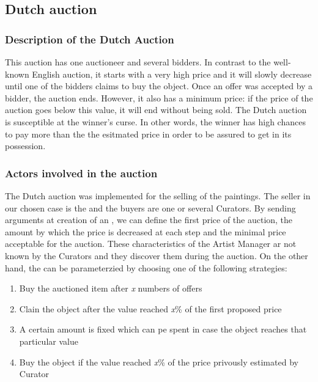 \documentclass[a4paper,11pt]{article}
\begin{document}
  \subsection{Dutch auction}

  \subsubsection{Description of the Dutch Auction}
  
  This auction has one auctioneer and several bidders. In contrast to the well-known English 
  auction, it starts with a very high price and it will slowly decrease until one of the bidders 
  claims to buy the object. Once an offer was accepted by a bidder, the auction ends. However, 
  it also has a minimum price: if the price of the auction goes below this value, it will end without being 
  sold. The Dutch auction is susceptible at the winner's curse. In other words, the winner has high 
  chances to pay more than the the esitmated price in order to be assured to get in its possession.
  
  \subsubsection{Actors involved in the auction}
  
  The Dutch auction was implemented for the selling of the paintings. The seller in our chosen case 
  is the \am{} and the buyers are one or several Curators. By sending arguments at creation of an 
  \am{}, we can define the first price of the auction, the amount by which the price is decreased 
  at each step and the minimal price acceptable for the auction. These characteristics of the Artist 
  Manager ar not known by the Curators and they discover them during the auction. On the other hand,
  the \cu{} can be parameterzied by choosing one of the following strategies:
  \begin{enumerate}
   \item Buy the auctioned item after \textit{x} numbers of offers
   \item Clain the object after the value reached \textit{x}\% of the first proposed price
   \item A certain amount is fixed which can pe spent in case the object reaches that particular value
   \item Buy the object if the value reached \textit{x}\% of the price privously estimated by Curator
  \end{enumerate}
\end{document}
